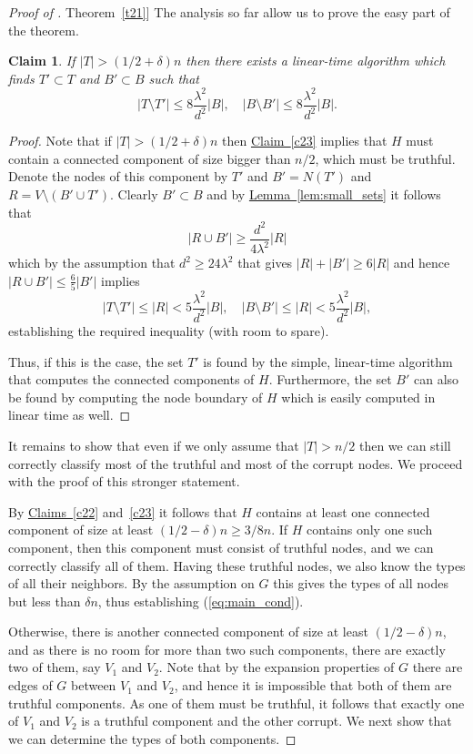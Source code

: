 \documentclass[11pt]{article}
\numberwithin{equation}{section}
\newtheorem{claim}[theorem]{Claim}
\theoremstyle{definition}
\theoremstyle{plain}
\newcommand{\expref}[2]{\hyperref[#2]{#1~\ref{#2}}}
\begin{document}
\begin{proof}[Proof of \expref{Theorem}{t21}]
The analysis so far allow us to prove the easy part of the theorem.
\begin{claim}
  If  $|T|>(1/2+\delta)n$ then there exists a linear-time algorithm 
  which finds $T' \subset T$ and $B' \subset B$ such that 
  \[
    |T \setminus T'| \leq 8 \frac{\lambda^2}{d^2} |B| , \quad 
    |B \setminus B'| \leq  8 \frac{\lambda^2}{d^2} |B|. 
  \]
\end{claim}

\begin{proof}
  Note that if $|T|>(1/2+\delta)n$ then \expref{Claim}{c23} implies
  that $H$ must contain a connected component of size bigger than
  $n/2$, which must be truthful. Denote the nodes of this component
  by $T'$ and $B' = N(T')$ and $R = V \setminus (B' \cup T')$. Clearly
  $B' \subset B$ and by \expref{Lemma}{lem:small_sets} it follows that
\[
  |R \cup B'| \geq \frac{d^2}{4 \lambda^2} |R|
\]
which by the assumption that $d^2 \geq 24 \lambda^2$ that gives
$|R|+|B'| \geq 6|R|$ and hence $|R \cup B'| \leq \frac{6}{5}|B'|$
implies
 \[
|T \setminus T'| \leq |R| <
5 \frac{\lambda^2}{d^2} |B| , \quad |B \setminus B'| \leq 
|R|<  5 \frac{\lambda^2}{d^2} |B|, 
\]
establishing the required inequality (with room to spare).


Thus, if this is the case, the set $T'$ is found  
%
by the simple, linear-time algorithm that computes the connected
components of $H$. Furthermore, the set $B'$ can also be found by computing the node boundary of $H$ which is easily computed in linear time as well.
\end{proof}
 
%
%
%
%

It remains to show that even if we only
assume that $|T|>n/2$ then we can still
%
correctly classify   %
most of the truthful and   %
most of the %
corrupt nodes. 
We proceed with the proof of this stronger statement.

By \expref{Claims}{c22} and~\ref{c23} it follows that $H$ contains 
at least one
connected component of size at least $(1/2-\delta)n \geq 3/8 n$.
If $H$ contains only one such component, then this component  
must consist of truthful nodes, and we can
%
correctly classify  %
all of them.
Having these truthful nodes, we also
know the types of all their neighbors. By the assumption on $G$
this gives the types of all nodes 
but less than $\delta n$, thus establishing
(\ref{eq:main_cond}). 
%
%
%
%
%
%
%
%
%
%
%
%
%

 
Otherwise, there is another connected component of size at least
$(1/2-\delta)n$, and as there is no room for more than two such
components, there are exactly two of them, say $V_1$ and $V_2$. Note
that by the expansion properties of $G$ there are edges of $G$ between $V_1$
and $V_2$, and hence it is impossible that both of them are
truthful components.  As one of them must be truthful, it follows
that exactly one of $V_1$ and $V_2$ is a truthful component and the 
other corrupt. We next show that we can determine the types of both
components.  %


\end{proof}
\end{document}

